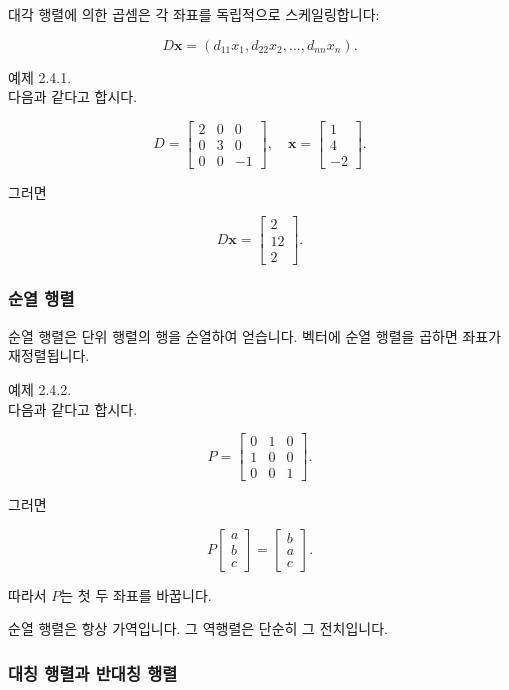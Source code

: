 \documentclass[
  12pt,
  a4paper,
]{article}
\begin{document}
대각 행렬에 의한 곱셈은 각 좌표를 독립적으로 스케일링합니다:

\[D\mathbf{x} = (d_{11}x_1, d_{22}x_2, \dots, d_{nn}x_n).\]

예제 2.4.1.\\
다음과 같다고 합시다.

\[D = \begin{bmatrix} 2 & 0 & 0 \\
0 & 3 & 0 \\
0 & 0 & -1 \end{bmatrix}, \quad
\mathbf{x} = \begin{bmatrix}
1 \\
4 \\
-2 \end{bmatrix}.\]

그러면

\[D\mathbf{x} = \begin{bmatrix}
2 \\
12 \\
2 \end{bmatrix}.\]

\subsubsection{순열 행렬}\label{permutation-matrices}

순열 행렬은 단위 행렬의 행을 순열하여 얻습니다. 벡터에 순열 행렬을 곱하면 좌표가 재정렬됩니다.

예제 2.4.2.\\
다음과 같다고 합시다.

\[P = \begin{bmatrix}
0 & 1 & 0 \\
1 & 0 & 0 \\
0 & 0 & 1
\end{bmatrix}.\]

그러면

\[P\begin{bmatrix}
a \\
b \\
c \end{bmatrix} =
\begin{bmatrix} b \\
a \\
c \end{bmatrix}.\]

따라서 \(P\)는 첫 두 좌표를 바꿉니다.

순열 행렬은 항상 가역입니다. 그 역행렬은 단순히 그 전치입니다.

\subsubsection{대칭 행렬과 반대칭 행렬}\label{symmetric-and-skew-symmetric-matrices}
\end{document}
